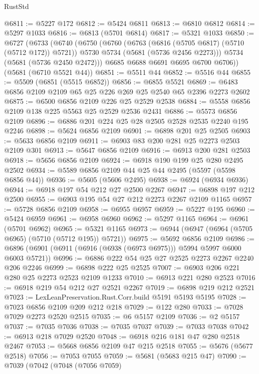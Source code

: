 \begin{lexlean}{RustStd}
\begin{coremodule}
@6811 := @5227 @172
@6812 := @5424 @6811
@6813 := @6810 @6812
@6814 := @5297 @1033
@6816 := @6813 (@5701 @6814)
@6817 := @5321 @1033
@6850 := @6727
    (@6733
      (@6740
        (@6750
          (@6760
            (@6763 (@6816 (@5705 @6817) (@5710 (@5712 @172)) @5721))
            @5730
            @5734
            (@5681 (@5736 @2456 @2273)))
          @5734
          (@5681 (@5736 @2450 @2472)))
        @6685
        @6688
        @6691
        @6695
        @6700
        @6706))
    (@5681 (@6710 @5521 @44))
@6851 := @5511 @44
@6852 := @5516 @44
@6855 := @5509 (@6851 (@5515 @6852))
@6856 := @6855 @5521
@6869 := @6483 @6856 @2109 @2109 @65 @25 @226 @269 @25 @2540 @65 @2396 @2273 @2602
@6875 := @6500 @6856 @2109 @226 @25 @2529 @2538
@6884 := @5558 @6856 @2109 @138 @225 @5563 @25 @2529 @2536 @2431
@6886 := @5573 @6856 @2109
@6896 := @6886 @201 @224 @25 @28 @2505 @2528 @2535 @2240 @195 @2246
@6898 := @5624 @6856 @2109
@6901 := @6898 @201 @25 @2505
@6903 := @5633 @6856 @2109
@6911 := @6903 @83 @200 @281 @25 @2273 @2503 @2109 @301
@6913 := @5647 @6856 @2109
@6916 := @6913 @200 @281 @2503
@6918 := @5656 @6856 @2109
@6924 := @6918 @190 @199 @25 @280 @2495 @2502
@6934 := @5589 @6856 @2109 @44 @25 @44 @2495 (@5597 (@5598 @6856 @44))
@6936 := @5605 (@5606 @2495)
@6938 := @6924 (@6934 @6936)
@6944 := @6918 @197 @54 @212 @27 @2500 @2267
@6947 := @6898 @197 @212 @2500
@6955 := @6903 @195 @54 @27 @212 @2273 @2267 @2109 @1165
@6957 := @5728 @6856 @2109
@6958 := @6955 @6957
@6959 := @5227 @195
@6960 := @5424 @6959
@6961 := @6958 @6960
@6962 := @5297 @1165
@6964 := @6961 (@5701 @6962)
@6965 := @5321 @1165
@6973 := @6944 (@6947 (@6964 (@5705 @6965) (@5710 (@5712 @195)) @5721))
@6975 := @5692 @6856 @2109
@6986 := @6896 (@6901 (@6911 (@6916 (@6938 (@6973 @6975))) @5994 @5997 @6000 @6003 @5721))
@6996 := @6886 @222 @54 @25 @27 @2525 @2273 @2267 @2240 @206 @2246
@6999 := @6898 @222 @25 @2525
@7007 := @6903 @206 @221 @280 @25 @2273 @2523 @2109 @1233
@7010 := @6913 @221 @280 @2523
@7016 := @6918 @219 @54 @212 @27 @2521 @2267
@7019 := @6898 @219 @212 @2521
@7023 := LexLeanPreservation.Rust.Corr.build @5191 @5193 @5195
@7028 := @7023 @6856 @2109 @209 @212 @218
@7029 := @122 @280
@7033 := @7028 @7029 @2273 @2520 @2515
@7035 := @6 @5157 @2109
@7036 := @2 @5157
@7037 := @7035 @7036
@7038 := @7035 @7037
@7039 := @7033 @7038
@7042 := @6913 @218 @7029 @2520
@7048 := @6918 @216 @181 @47 @280 @2518 @2467
@7053 := @5668 @6856 @2109 @47 @215 @2518
@7055 := @5676 (@5677 @2518)
@7056 := @7053 @7055
@7059 := @5681 (@5683 @215 @47)
@7090 := @7039
    (@7042
      (@7048
        (@7056 @7059)

\end{coremodule}
\end{lexlean}
